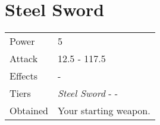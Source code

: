 \section{Steel Sword}
\label{weapon:steel_sword}


\noindent\begin{tabularx}{\textwidth}[l]{lX}
	Power
	& 5
\\ %
	Attack
	& 12.5 - 117.5
\\ %
	Effects
	& -
\\ %
	Tiers
	& \textit{Steel Sword} - \nameref{weapon:knights_sword} - \nameref{weapon:excalibur}
\\ %
	Obtained
	& Your starting weapon.
\end{tabularx}
